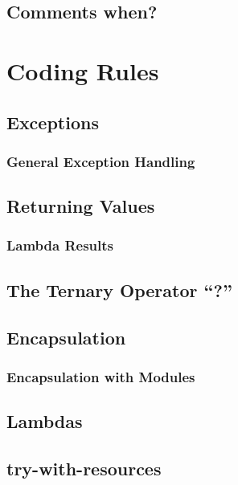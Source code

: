 \documentclass[12pt,a4paper,titlepage, parskip=half, headsepline, footsepline, cleardoubleplain]{scrbook}
\begin{document}
\section{Comments when?}\label{sec:CommentsWhen}

\chapter{Coding Rules}\label{sec:CodingRules}

\section{Exceptions}

\subsection{General Exception Handling}\label{sec:GeneralExceptionHandling}

\section{Returning Values}\label{sec:ReturningValues}

\subsection{Lambda Results}\label{sec:LambdaResults}

\section{The Ternary Operator “?”}\label{sec:TheTernaryOperator}

\section{Encapsulation}

\subsection{Encapsulation with Modules}\label{sec:EncapsulationWithModules}

\section{Lambdas}\label{sec:Lambdas}

\section{try-with-resources}\label{sec:TryWithResources}
\end{document}
